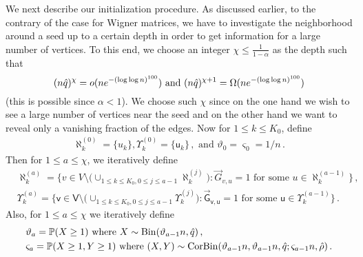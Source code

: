 \documentclass[11pt]{article}
\numberwithin{equation}{section}
\begin{document}
We next describe our initialization procedure. As discussed earlier, to the contrary of the case for Wigner matrices, we have to investigate the neighborhood around a seed up to a certain depth in order to get information for a large number of vertices. To this end, we choose an integer $\chi \leq \frac{1}{1-\alpha}$ as the depth such that 
\begin{equation} \label{eq-def-chi}
    (n \Hat{q})^{\chi} = o(n e^{- (\log \log n)^{100}}) \mbox{ and } (n \hat{q})^{\chi+1} = \Omega(n e^{- (\log \log n)^{100}})
\end{equation} 
(this is possible since $\alpha<1$). We choose such $\chi$ since on the one hand we wish to see a large number of vertices near the seed and on the other hand we want to reveal only a vanishing fraction of the edges. Now for $1 \leq k \leq K_0$, define
\begin{align}
    \aleph^{(0)}_k = \{ u_{k} \}, \Upsilon^{(0)}_k = \{ \mathsf{u}_{k} \} \,,
 \mbox{ and }  \vartheta_0 = \varsigma_0 = 1 / n \,.    \label{equ-def-initial-aleph-Upsilon}
\end{align}
Then for $1 \leq a \leq \chi$, we iteratively define 
\begin{equation}
\begin{aligned}
    & \aleph^{(a)}_k = \Big\{ v \in V \setminus \big( \cup_{1 \leq k \leq K_0, 0 \leq j \leq a-1} \aleph^{(j)}_k \big) :  \overrightarrow{G}_{v,u} = 1 \mbox{ for some } u \in \aleph^{(a-1)}_k \Big\} \,, \\
    & \Upsilon^{(a)}_k = \Big\{ \mathsf{v} \in \mathsf{V} \setminus \big( \cup_{1 \leq k \leq K_0, 0 \leq j \leq a-1} \Upsilon^{(j)}_k \big) :  \overrightarrow{\mathsf{G}}_{\mathsf{v},\mathsf{u}} = 1 \mbox{ for some } \mathsf{u} \in \Upsilon^{(a-1)}_k \Big\} \,.
    \label{equ-def-iter-aleph-Upsilon}
\end{aligned}
\end{equation}
Also,  for $1 \leq a \leq \chi$ we iteratively define
\begin{equation}
\begin{aligned}
    & \vartheta_a = \mathbb{P}( X \geq 1 ) \mbox { where } X \sim \mathrm{Bin}(\vartheta_{a-1}n,\Hat{q})  \,, \\ 
    & \varsigma_{a} = \mathbb{P} ( X \geq 1,Y \geq 1 ) \mbox{ where } (X,Y) \sim \mathrm{CorBin}(\vartheta_{a-1}n,\vartheta_{a-1}n, \Hat{q}; \varsigma_{a-1}n, \Hat{\rho})  \,. \label{equ-def-iter-vartheta-varsigma}
\end{aligned}
\end{equation}
\end{document}
